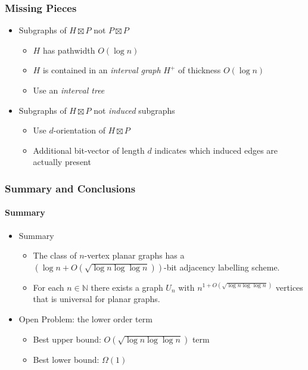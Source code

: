 \documentclass[aspectratio=169,xcolor=dvipsnames]{beamer}
\newcommand{\N}{\mathbb{N}}
\begin{document}
\begin{frame}
    \frametitle{Missing Pieces}

    \begin{itemize}[<+->]
        \item Subgraphs of $H\boxtimes P$ not $P\boxtimes P$
        \begin{itemize}
            \item $H$ has pathwidth $O(\log n)$
            \item $H$ is contained in an \emph{interval graph} $H^+$ of thickness $O(\log n)$
            \item Use an \emph{interval tree}
        \end{itemize}

        \item Subgraphs of $H\boxtimes P$ not \emph{induced} subgraphs
        \begin{itemize}
            \item Use $d$-orientation of $H\boxtimes P$
            \item Additional bit-vector of length $d$ indicates which induced edges are actually present
        \end{itemize}
    \end{itemize}
\end{frame}


\begin{frame}
    \frametitle{Summary and Conclusions}
    \framesubtitle{Summary}

    \begin{itemize}[<+->]
        \item Summary
        \begin{itemize}
            \item The class of $n$-vertex planar graphs has a $(\log n + O(\sqrt{\log n\log\log n}))$-bit adjacency labelling scheme.

            \item For each $n\in\N$ there exists a graph $U_n$ with $n^{1+O(\sqrt{\log n\log\log n})}$ vertices that is universal for planar graphs.
        \end{itemize}
        \item Open Problem: the lower order term
        \begin{itemize}
            \item Best upper bound: $O(\sqrt{\log n\log\log n})$ term
            \item Best lower bound: $\Omega(1)$
        \end{itemize}
    \end{itemize}
\end{frame}
\end{document}
